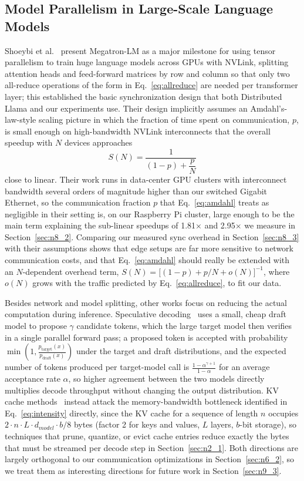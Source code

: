 \documentclass[11pt,a4paper]{article}
\begin{document}
\subsection{Model Parallelism in Large-Scale Language Models}\label{sec:n3_3}
Shoeybi et al.~\cite{shoeybi2019} present Megatron-LM as a major milestone for using tensor parallelism to train huge language models across GPUs with NVLink, splitting attention heads and feed-forward matrices by row and column so that only two all-reduce operations of the form in Eq.~\ref{eq:allreduce} are needed per transformer layer; this established the basic synchronization design that both Distributed Llama and our experiments use. Their design implicitly assumes an Amdahl's-law-style scaling picture in which the fraction of time spent on communication, $p$, is small enough on high-bandwidth NVLink interconnects that the overall speedup with $N$ devices approaches
\begin{equation}
S(N) = \frac{1}{(1-p) + \dfrac{p}{N}}
\label{eq:amdahl}
\end{equation}
close to linear. Their work runs in data-center GPU clusters with interconnect bandwidth several orders of magnitude higher than our switched Gigabit Ethernet, so the communication fraction $p$ that Eq.~\ref{eq:amdahl} treats as negligible in their setting is, on our Raspberry Pi cluster, large enough to be the main term explaining the sub-linear speedups of 1.81$\times$ and 2.95$\times$ we measure in Section~\ref{sec:n8_2}. Comparing our measured sync overhead in Section~\ref{sec:n8_3} with their assumptions shows that edge setups are far more sensitive to network communication costs, and that Eq.~\ref{eq:amdahl} should really be extended with an $N$-dependent overhead term, $S(N) = \big[(1-p) + p/N + o(N)\big]^{-1}$, where $o(N)$ grows with the traffic predicted by Eq.~\ref{eq:allreduce}, to fit our data.

Besides network and model splitting, other works focus on reducing the actual computation during inference. Speculative decoding~\cite{leviathan2023fast} uses a small, cheap draft model to propose $\gamma$ candidate tokens, which the large target model then verifies in a single parallel forward pass; a proposed token is accepted with probability $\min\!\left(1, \frac{p_{\text{target}}(x)}{p_{\text{draft}}(x)}\right)$ under the target and draft distributions, and the expected number of tokens produced per target-model call is $\frac{1-\alpha^{\gamma+1}}{1-\alpha}$ for an average acceptance rate $\alpha$, so higher agreement between the two models directly multiplies decode throughput without changing the output distribution. KV cache methods~\cite{li2024surveykv} instead attack the memory-bandwidth bottleneck identified in Eq.~\ref{eq:intensity} directly, since the KV cache for a sequence of length $n$ occupies $2 \cdot n \cdot L \cdot d_{model} \cdot b/8$ bytes (factor 2 for keys and values, $L$ layers, $b$-bit storage), so techniques that prune, quantize, or evict cache entries reduce exactly the bytes that must be streamed per decode step in Section~\ref{sec:n2_1}. Both directions are largely orthogonal to our communication optimizations in Section~\ref{sec:n6_2}, so we treat them as interesting directions for future work in Section~\ref{sec:n9_3}.
\end{document}
